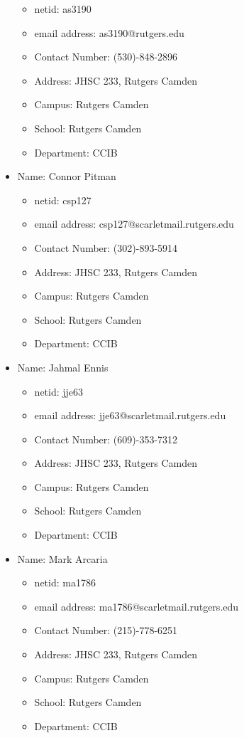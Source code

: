 \documentclass[oneside]{report}
\begin{document}
\begin{itemize}
	    \begin{itemize}               
			\item netid: as3190
                    	\item email address: as3190@rutgers.edu
                    	\item Contact Number: (530)-848-2896
                    	\item Address: JHSC 233, Rutgers Camden
                    	\item Campus: Rutgers Camden
                    	\item School: Rutgers Camden
                    	\item Department: CCIB
	    \end{itemize}
	    \item Name: Connor Pitman
	    \begin{itemize}               
			\item netid: csp127
                    	\item email address: csp127@scarletmail.rutgers.edu
                    	\item Contact Number: (302)-893-5914
                    	\item Address: JHSC 233, Rutgers Camden
                    	\item Campus: Rutgers Camden
                    	\item School: Rutgers Camden
                    	\item Department: CCIB
	    \end{itemize}
	    \item Name: Jahmal Ennis
	    \begin{itemize}               
			\item netid: jje63
                    	\item email address: jje63@scarletmail.rutgers.edu
                    	\item Contact Number: (609)-353-7312
                    	\item Address: JHSC 233, Rutgers Camden
                    	\item Campus: Rutgers Camden
                    	\item School: Rutgers Camden
                    	\item Department: CCIB
	    \end{itemize}
	    \item Name: Mark Arcaria
	    \begin{itemize}               
			\item netid: ma1786
                    	\item email address: ma1786@scarletmail.rutgers.edu
                    	\item Contact Number: (215)-778-6251
                    	\item Address: JHSC 233, Rutgers Camden
                    	\item Campus: Rutgers Camden
                    	\item School: Rutgers Camden
                    	\item Department: CCIB
	    \end{itemize}

    \end{itemize}\printbibliography
\end{document}
